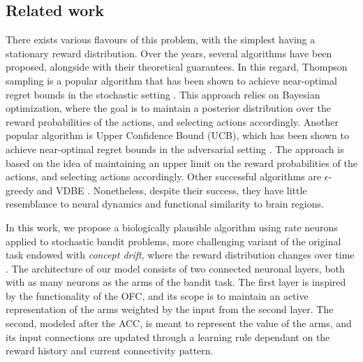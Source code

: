 \subsection{Related work}
There exists various flavours of this problem, with the simplest having a stationary reward distribution.
Over the years, several algorithms have been proposed, alongside with their theoretical guarantees.
In this regard, Thompson sampling is a popular algorithm that has been shown to achieve near-optimal regret bounds in the stochastic setting \cite{agrawalAnalysisThompsonSampling2012, kaufmannThompsonSamplingAsymptotically2012}.
This approach relies on Bayesian optimization, where the goal is to maintain a posterior distribution over the reward probabilities of the actions, and selecting actions accordingly.
Another popular algorithm is Upper Confidence Bound (UCB), which has been shown to achieve near-optimal regret bounds in the adversarial setting \cite{auerFinitetimeAnalysisMultiarmed2002}.
The approach is based on the idea of maintaining an upper limit on the reward probabilities of the actions, and selecting actions accordingly.
Other successful algorithms are $\epsilon$-greedy and VDBE \cite{gittinsBanditProcessesDynamic1979, banMultifacetContextualBandits2021, tokicAdaptiveEGreedyExploration2010, tokicValueDifferenceBasedExploration2011}.
Nonetheless, despite their success, they have little resemblance to neural dynamics and functional similarity to brain regions.

In this work, we propose a biologically plausible algorithm using rate neurons applied to stochastic bandit problems, more challenging variant of the original task endowed with \textit{concept drift}, where the reward distribution changes over time \cite{garivierUpperConfidenceBoundPolicies2008, besbesStochasticMultiArmedBanditProblem2014, cavenaghiNonStationaryMultiArmed2021}.
The architecture of our model consists of two connected neuronal layers, both with as many neurons as the arms of the bandit task.
The first layer is inspired by the functionality of the OFC, and its scope is to maintain an active representation of the arms weighted by the input from the second layer.
The second, modeled after the ACC, is meant to represent the value of the arms, and its input connections are updated through a learning rule dependant on the reward history and current connectivity pattern.

